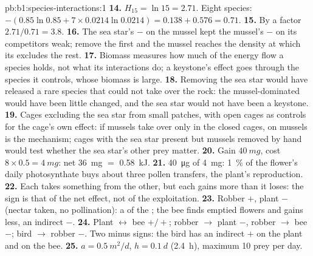 \begin{solution}{pb:b1:species-interactions:1}
\textbf{14.} $H_{15} = \ln 15 = 2.71$. Eight species: $-(0.85\ln 0.85
+ 7\times 0.0214\ln 0.0214) = 0.138 + 0.576 = 0.71$.
\textbf{15.} By a factor $2.71/0.71 = 3.8$.
\textbf{16.} The sea star's $-$ on the mussel kept the mussel's $-$ on
its competitors weak; remove the first and the mussel reaches the
density at which its  excludes the rest.
\textbf{17.} Biomass measures how much of the energy flow a species
holds, not what its interactions do; a keystone's effect goes through
the species it controls, whose biomass is large.
\textbf{18.} Removing the sea star would have released a rare species
that could not take over the rock: the mussel-dominated 
would have been little changed, and the sea star would not have been
a keystone.
\textbf{19.} Cages excluding the sea star from small patches, with
open cages as controls for the cage's own effect: if mussels take
over only in the closed cages,  on mussels is the mechanism;
cages with the sea star present but mussels removed by hand would
test whether the sea star's other prey matter.
\textbf{20.} Gain $\qty{40}{mg}$, cost $8\times 0.5 = \qty{4}{mg}$: net
\qty{36}{mg} $=$ \qty{0.58}{kJ}.
\textbf{21.} \qty{40}{\micro g} of \qty{4}{mg}: \qty{1}{\%} of the
flower's daily photosynthate buys about three pollen transfers, the
plant's reproduction.
\textbf{22.} Each takes something from the other, but each gains more
than it loses: the sign is that of the net effect, not of the
exploitation.
\textbf{23.} Robber $+$, plant $-$ (nectar taken, no pollination): a
 of the ; the bee finds emptied flowers and gains
less, an indirect $-$.
\textbf{24.} Plant $\leftrightarrow$ bee $+/+$; robber $\to$ plant $-$,
robber $\to$ bee $-$; bird $\to$ robber $-$. Two minus signs: the bird
has an indirect $+$ on the plant and on the bee.
\textbf{25.} $a = \qty{0.5}{m^2/d}$, $h = \qty{0.1}{d}$ (\qty{2.4}{h}),
maximum \num{10} prey per day.
\end{solution}
